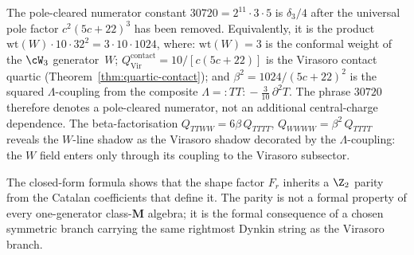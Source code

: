 \begin{remark}
\label{rem:number-30720}%
The pole-cleared numerator constant \(30720 = 2^{11}\cdot3\cdot5\)
is \(\delta_3/4\) after the universal pole factor
\(c^2(5c+22)^3\) has been removed. Equivalently, it is the product
\(\mathrm{wt}(W)\cdot10\cdot32^2=3\cdot10\cdot1024\), where:
$\mathrm{wt}(W) = 3$ is the conformal weight of the
$\cW_3$ generator~$W$;
$Q_{\mathrm{Vir}}^{\mathrm{contact}} = 10/[c(5c{+}22)]$
is the Virasoro contact quartic
\textup{(}Theorem~\textup{\ref{thm:quartic-contact}}\textup{)};
and $\beta^2 = 1024/(5c{+}22)^2$ is the squared
$\Lambda$-coupling from the composite
$\Lambda = {:\!TT\!:} - \tfrac{3}{10}\,\partial^2 T$.
The phrase \(30720\) therefore denotes a pole-cleared numerator, not an additional central-charge dependence.
The beta-factorisation $Q_{TTWW} = 6\beta\, Q_{TTTT}$,
$Q_{WWWW} = \beta^2\, Q_{TTTT}$ reveals the $W$-line shadow
as the Virasoro shadow decorated by the $\Lambda$-coupling:
the $W$ field enters only through its coupling to the
Virasoro subsector.
\end{remark}

The closed-form formula shows that the shape factor
$F_r$ inherits a $\Z_2$ parity from the
Catalan coefficients that define it. The parity is not a formal
property of every one-generator class-$\mathbf M$ algebra; it is the
formal consequence of a chosen symmetric branch carrying the same
rightmost Dynkin string as the Virasoro branch.

